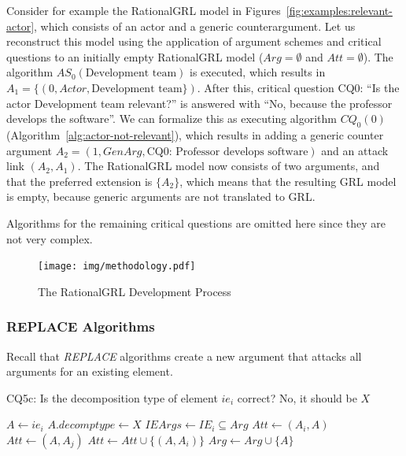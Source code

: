 Consider for example the RationalGRL model in Figures~\ref{fig:examples:relevant-actor}, which consists of an actor and a generic counterargument. Let us reconstruct this model using the application of argument schemes and critical questions to an initially empty RationalGRL model ($Arg=\emptyset$ and $Att=\emptyset$). The algorithm $AS_0(\text{Development team})$ is executed, which results in $A_1=\{(0,Actor,\text{Development team}\})$. After this, critical question CQ0: ``Is the actor Development team relevant?'' is answered with ``No, because the professor develops the software''. We can formalize this as executing algorithm $CQ_0(0)$ (Algorithm~\ref{alg:actor-not-relevant}), which results in adding a generic counter argument $A_2=(1, GenArg, \text{CQ0: Professor develops software})$ and an attack link $(A_2,A_1)$. The RationalGRL model now consists of two arguments, and that the preferred extension is $\{A_2\}$, which means that the resulting GRL model is empty, because generic arguments are not translated to GRL.

Algorithms for the remaining critical questions are omitted here since they are not very complex. 

\begin{figure}[b]
\centering
\texttt{[image: img/methodology.pdf]}
\caption{The RationalGRL Development Process}
\label{fig:rationalgrl-methodology}
\end{figure}

\subsubsection{REPLACE Algorithms}
\label{sect:formalframework:replace}

Recall that \emph{REPLACE} algorithms create a new argument that attacks all arguments for an existing element.

\begin{algorithm}[h]
  \caption{CQ5c: Is the decomposition type of element $ie_i$ correct? No, it should be $X$ }\label{alg:replace1}
  \begin{algorithmic}[1]
    \State $A \leftarrow ie_i$\label{alg:replace1:arg}
    \State $A.decomptype\leftarrow X$\label{alg:replace1:decompchange}
    \State $IEArgs\leftarrow IE_i\subseteq  Arg$\label{alg:replace1:ieargs}
    \label{alg:replace1:for1}
      \State $Att\leftarrow (A_i,A)$
    \EndFor
    \label{alg:replace1:for2}
      \State $Att\leftarrow (A,A_j)$
    \label{alg:replace1:for3}
      \State $Att \leftarrow Att \cup \{(A,A_i)\}$\label{alg:replace1:att}
    \EndFor
    \EndFor
    \State $Arg\leftarrow Arg \cup \{A\}$\label{alg:replace1:addarg}
    \EndProcedure
  \end{algorithmic}
\end{algorithm}

